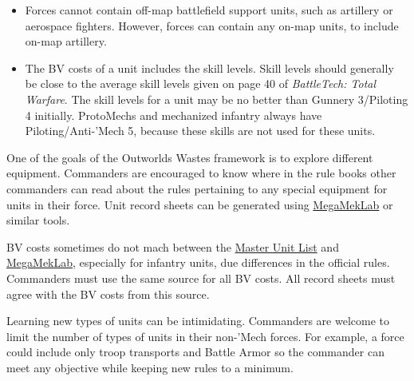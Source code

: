 \begin{itemize}
\item Forces cannot contain off-map battlefield support units, such as artillery or aerospace fighters.
However, forces can contain any on-map units, to include on-map artillery.

\item The BV costs of a unit includes the skill levels.
Skill levels should generally be close to the average skill levels given on page 40 of \emph{BattleTech: Total Warfare}.
The skill levels for a unit may be no better than Gunnery 3/Piloting 4 initially.
ProtoMechs and mechanized infantry always have Piloting/Anti-'Mech 5, because these skills are not used for these units.

\end{itemize}

One of the goals of the Outworlds Wastes framework is to explore different equipment.
Commanders are encouraged to know where in the rule books other commanders can read about the rules pertaining to any special equipment for units in their force.
Unit record sheets can be generated using \href{https://megamek.org}{MegaMekLab} or similar tools.

BV costs sometimes do not mach between the \href{http://www.masterunitlist.info}{Master Unit List} and \href{https://megamek.org}{MegaMekLab}, especially for infantry units, due differences in the official rules.
Commanders must use the same source for all BV costs.
All record sheets must agree with the BV costs from this source.

Learning new types of units can be intimidating.
Commanders are welcome to limit the number of types of units in their non-'Mech forces.
For example, a force could include only troop transports and Battle Armor so the commander can meet any objective while keeping new rules to a minimum.

